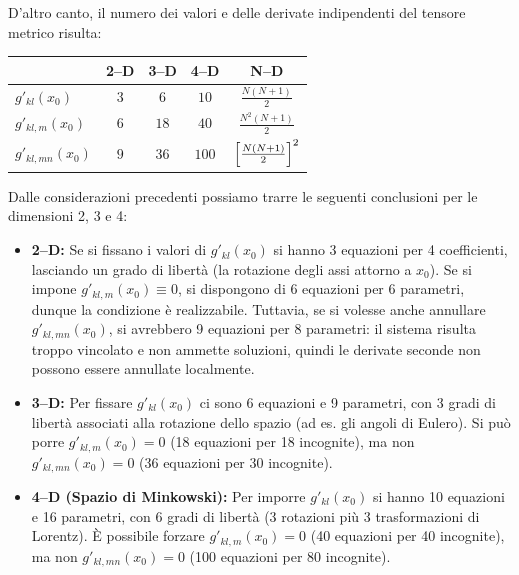 D'altro canto, il numero dei valori e delle derivate indipendenti del tensore metrico risulta:

\begin{center}
    \begin{tabular}{lcccc}
    \toprule
     & \textbf{2--D} & \textbf{3--D} & \textbf{4--D} & \textbf{N--D}\\
    \midrule
    $\displaystyle g'_{kl}(x_0)$
       & $3$
       & $6$
       & $10$
       & $\displaystyle \frac{N(N+1)}{2}$\\
    \midrule
    $\displaystyle g'_{kl,m}(x_0)$
       & $6$
       & $18$
       & $40$
       & $\displaystyle \frac{N^2(N+1)}{2}$\\
    \midrule
    $\displaystyle g'_{kl,mn}(x_0)$
       & $9$
       & $36$
       & $100$
       & $\displaystyle \Bigl[\tfrac{N(N+1)}{2}\Bigr]^2$\\
    \bottomrule
    \end{tabular}
\end{center}
    

Dalle considerazioni precedenti possiamo trarre le seguenti conclusioni per le dimensioni 2, 3 e 4:

\begin{itemize}
    \item \textbf{2--D:} Se si fissano i valori di $g'_{kl}(x_0)$ si hanno 3 equazioni per 4 coefficienti, lasciando un grado di libertà (la rotazione degli assi attorno a $x_0$). Se si impone $g'_{kl,m}(x_0) \equiv 0$, si dispongono di 6 equazioni per 6 parametri, dunque la condizione è realizzabile. Tuttavia, se si volesse anche annullare $g'_{kl,mn}(x_0)$, si avrebbero 9 equazioni per 8 parametri: il sistema risulta troppo vincolato e non ammette soluzioni, quindi le derivate seconde non possono essere annullate localmente.

    \item \textbf{3--D:} Per fissare $g'_{kl}(x_0)$ ci sono 6 equazioni e 9 parametri, con 3 gradi di libertà associati alla rotazione dello spazio (ad es. gli angoli di Eulero). Si può porre $g'_{kl,m}(x_0) = 0$ (18 equazioni per 18 incognite), ma non $g'_{kl,mn}(x_0) = 0$ (36 equazioni per 30 incognite).

    \item \textbf{4--D (Spazio di Minkowski):} Per imporre $g'_{kl}(x_0)$ si hanno 10 equazioni e 16 parametri, con 6 gradi di libertà (3 rotazioni più 3 trasformazioni di Lorentz). È possibile forzare $g'_{kl,m}(x_0) = 0$ (40 equazioni per 40 incognite), ma non $g'_{kl,mn}(x_0) = 0$ (100 equazioni per 80 incognite).
\end{itemize}

